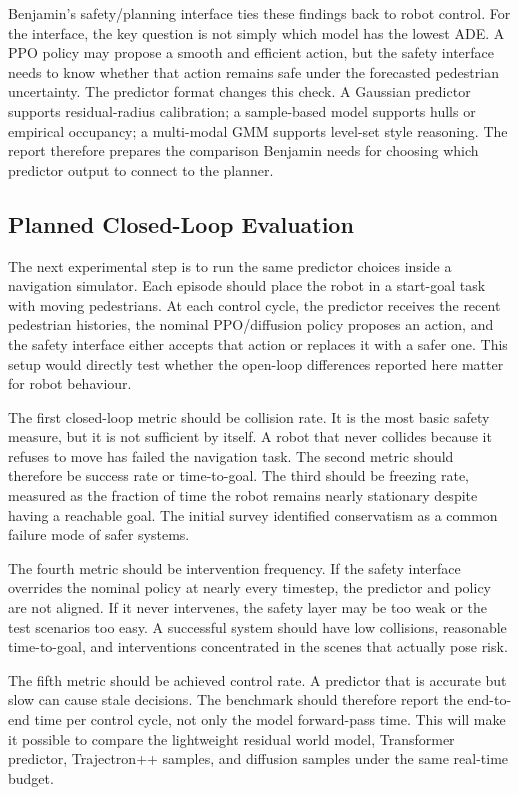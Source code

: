 \documentclass[conference]{IEEEtran}
\begin{document}
Benjamin's safety/planning interface ties these findings back to robot control.
For the interface, the key question is not simply which model has the
lowest ADE. A PPO policy may propose a smooth and efficient action, but the
safety interface needs to know whether that action remains safe under the
forecasted pedestrian uncertainty. The predictor format changes this check. A
Gaussian predictor supports residual-radius calibration; a sample-based model
supports hulls or empirical occupancy; a multi-modal GMM supports level-set
style reasoning. The report therefore prepares the comparison Benjamin needs
for choosing which predictor output to connect to the planner.

\subsection{Planned Closed-Loop Evaluation}

The next experimental step is to run the same predictor choices inside a
navigation simulator. Each episode should place the robot in a start-goal task
with moving pedestrians. At each control cycle, the predictor receives the
recent pedestrian histories, the nominal PPO/diffusion policy proposes an
action, and the safety interface either accepts that action or replaces it with
a safer one. This setup would directly test whether the open-loop differences
reported here matter for robot behaviour.

The first closed-loop metric should be collision rate. It is the most basic
safety measure, but it is not sufficient by itself. A robot that never collides
because it refuses to move has failed the navigation task. The second metric should therefore be
success rate or time-to-goal. The third should be freezing rate, measured as the
fraction of time the robot remains nearly stationary despite having a reachable
goal. The initial survey identified conservatism as a common failure
mode of safer systems.

The fourth metric should be intervention frequency. If the safety interface
overrides the nominal policy at nearly every timestep, the predictor and policy
are not aligned. If it never intervenes, the safety layer may be too weak or the
test scenarios too easy. A successful system should have low collisions, reasonable
time-to-goal, and interventions concentrated in the scenes that actually pose risk.

The fifth metric should be achieved control rate. A predictor that is accurate
but slow can cause stale decisions. The benchmark should therefore report the
end-to-end time per control cycle, not only the model forward-pass time. This
will make it possible to compare the lightweight residual world model,
Transformer predictor, Trajectron++ samples, and diffusion samples under the
same real-time budget.
\end{document}
